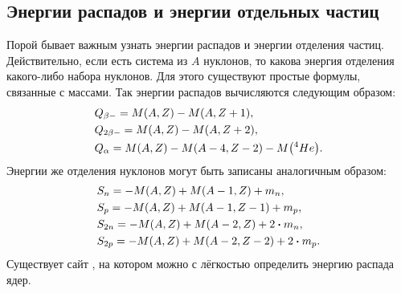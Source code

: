 \documentclass[12pt]{article}
\begin{document}
\subsection{Энергии распадов и энергии отдельных частиц}
Порой бывает важным узнать энергии распадов и энергии отделения частиц. Действительно, если есть система из $A$ нуклонов, то какова энергия отделения какого\--либо набора нуклонов. Для этого существуют простые формулы, связанные с массами. Так энергии распадов вычисляются следующим образом:
\begin{equation}
	\begin{split}
	&Q_{\beta -} = M\qty(A,Z) - M\qty(A,Z+1),\\
	&Q_{2\beta -} = M\qty(A,Z) - M\qty(A,Z+2),\\
	&Q_{\alpha} = M\qty(A,Z) - M\qty(A-4,Z-2) - M\qty({}^4 He).
	\end{split}
\end{equation}
Энергии же отделения нуклонов могут быть записаны аналогичным образом:
\begin{equation}
\begin{split}
	&S_{n} = -M\qty(A,Z) + M\qty(A-1,Z) + m_n,\\
	&S_p = -M\qty(A,Z) + M\qty(A-1,Z-1) + m_p,\\
	&S_{2n} = -M\qty(A,Z) + M\qty(A-2,Z) + 2\vdot m_n,\\
	&S_{2p} = -M\qty(A,Z) + M\qty(A-2,Z-2) + 2\vdot m_p.
\end{split}
\end{equation}
Существует сайт \cite{qcalc}, на котором можно с лёгкостью определить энергию распада ядер.
\end{document}
